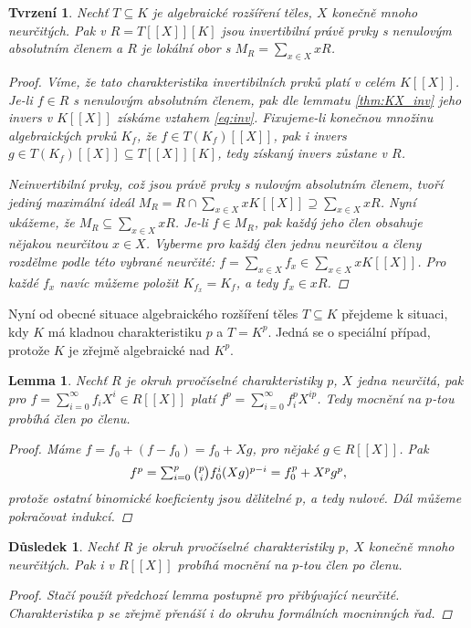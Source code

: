 \documentclass[11pt,a4paper]{article}
\newcommand*{\ml}[1]{\[\textstyle\let\displaystyle\textstyle#1\]}	%
\newcounter{numb}
\theoremstyle{definition}
\theoremstyle{plain}
\newtheorem{lemma}[numb]{Lemma}
\newtheorem{tvrzeni}[numb]{Tvrzení}
\newtheorem{dusledek}[numb]{Důsledek}
\begin{document}
\begin{tvrzeni}
	Nechť $T \subseteq K$ je algebraické rozšíření těles, $X$ konečně mnoho neurčitých. Pak v $R = T[[X]][K]$ jsou invertibilní právě prvky s nenulovým absolutním členem a $R$ je lokální obor s $M_R = \sum_{x \in X} xR$.

	\begin{proof}
		Víme, že tato charakteristika invertibilních prvků platí v celém $K[[X]]$. Je-li $f \in R$ s nenulovým absolutním členem, pak dle lemmatu \ref{thm:KX_inv} jeho invers v $K[[X]]$ získáme vztahem \eqref{eq:inv}. Fixujeme-li konečnou množinu algebraických prvků $K_f$, že $f \in T(K_f)[[X]]$, pak i invers $g \in T(K_f)[[X]] \subseteq T[[X]][K]$, tedy získaný invers zůstane v $R$.

		Neinvertibilní prvky, což jsou právě prvky s nulovým absolutním členem, tvoří jediný maximální ideál $M_R = R \cap \sum_{x \in X} x K[[X]] \supseteq \sum_{x \in X} x R$. Nyní ukážeme, že $M_R \subseteq \sum_{x \in X} xR$. Je-li $f \in M_R$, pak každý jeho člen obsahuje nějakou neurčitou $x \in X$. Vyberme pro každý člen jednu neurčitou a členy rozdělme podle této vybrané neurčité: $f = \sum_{x \in X} f_x \in \sum_{x \in X} x K[[X]]$. Pro každé $f_x$ navíc můžeme položit $K_{f_x} = K_f$, a tedy $f_x \in xR$.
	\end{proof}
\end{tvrzeni}

Nyní od obecné situace algebraického rozšíření těles $T \subseteq K$ přejdeme k situaci, kdy $K$ má kladnou charakteristiku $p$ a $T = K^p$. Jedná se o speciální případ, protože $K$ je zřejmě algebraické nad $K^p$.

\begin{lemma}
	Nechť $R$ je okruh prvočíselné charakteristiky $p$, $X$ jedna neurčitá, pak pro $f = \sum_{i = 0}^\infty f_i X^i \in R[[X]]$ platí $f^p = \sum_{i = 0}^\infty f_i^p X^{ip}$. Tedy mocnění na $p$-tou probíhá člen po členu.

	\begin{proof}
		Máme $f = f_0 + (f - f_0) = f_0 + X g$, pro nějaké $g \in R[[X]]$. Pak
		\ml{
			f^p = \sum_{i = 0}^p \binom{p}{i} f_0^i (X g)^{p - i} = f_0^p + X^p g^p,
		}
		protože ostatní binomické koeficienty jsou dělitelné $p$, a tedy nulové. Dál můžeme pokračovat indukcí.
	\end{proof}
\end{lemma}

\begin{dusledek} \label{thm:p_power}
	Nechť $R$ je okruh prvočíselné charakteristiky $p$, $X$ konečně mnoho neurčitých. Pak i v $R[[X]]$ probíhá mocnění na $p$-tou člen po členu.

	\begin{proof}
		Stačí použít předchozí lemma postupně pro přibývající neurčité. Charakteristika $p$ se zřejmě přenáší i do okruhu formálních mocninných řad.
	\end{proof}
\end{dusledek}
\end{document}
